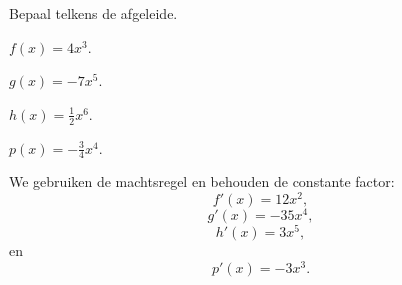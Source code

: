 \documentclass{ximera}
\begin{document}
\begin{oefening}{\oefB\ESS}

Bepaal telkens de afgeleide.

\begin{question}

\(
f(x)=4x^3.
\)

\end{question}

\begin{question}

\(
g(x)=-7x^5.
\)

\end{question}

\begin{question}

\(
h(x)=\frac12 x^6.
\)

\end{question}

\begin{question}

\(
p(x)=-\frac34 x^4.
\)

\end{question}

\begin{oplossing}

We gebruiken de machtsregel en behouden de constante factor:
\[
f'(x)=12x^2,
\]
\[
g'(x)=-35x^4,
\]
\[
h'(x)=3x^5,
\]
en
\[
p'(x)=-3x^3.
\]

\end{oplossing}

\end{oefening}


\end{document}
